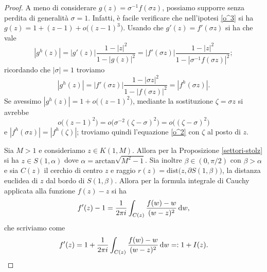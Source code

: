 \begin{proof}
  A meno di considerare $g(z)=\sigma^{-1}f(\sigma z)$, possiamo supporre senza perdita di generalità $\sigma=1$. Infatti, è facile verificare che nell'ipotesi \eqref{o^3} si ha $g(z)=1+(z-1)+o\bigl((z-1)^3\bigr)$. Usando che $g'(z)=f'(\sigma z)$ si ha che vale
  $$|g^h(z)|=|g'(z)|\frac{1-|z|^2}{1-|g(z)|^2}=|f'(\sigma z)|\frac{1-|z|^2}{1-|\sigma^{-1}f(\sigma z)|^2};$$
  ricordando che $|\sigma|=1$ troviamo
  $$|g^h(z)|=|f'(\sigma z)|\frac{1-|\sigma z|^2}{1-|f(\sigma z)|^2}=|f^h(\sigma z)|.$$
  Se avessimo $|g^h(z)|=1+o\bigl((z-1)^2\bigr)$, mediante la sostituzione $\zeta=\sigma z$ si avrebbe
  $$o\bigl((z-1)^2\bigr)=o\bigl(\sigma^{-2}(\zeta-\sigma)^2\bigr)=o\bigl((\zeta-\sigma)^2\bigr)$$
  e $|f^h(\sigma z)|=|f^h(\zeta)|$; troviamo quindi l'equazione \eqref{o^2} con $\zeta$ al posto di $z$.

  Sia $M>1$ e consideriamo $z \in K(1,M)$. Allora per la Proposizione \ref{settori-stolz} si ha $z \in S(1,\alpha)$ dove $\alpha=\text{arctan}\sqrt{M^2-1}$.
  Sia inoltre $\beta \in (0,\pi/2)$ con $\beta>\alpha$ e sia $C(z)$ il cerchio di centro $z$ e raggio $r(z)=\text{dist}\bigl(z, \partial S(1,\beta)\bigr)$, la distanza euclidea di $z$ dal bordo di $S(1,\beta)$. Allora per la formula integrale di Cauchy applicata alla funzione $f(z)-z$ si ha
  $$f'(z)-1=\frac{1}{2\pi i} \int_{C(z)} \frac{f(w)-w}{(w-z)^2}\mathop{}\!\mathrm{d} w,$$
  che scriviamo come
  $$f'(z)=1+\frac{1}{2\pi i} \int_{C(z)} \frac{f(w)-w}{(w-z)^2}\mathop{}\!\mathrm{d} w=:1+I(z).$$


\end{proof}
